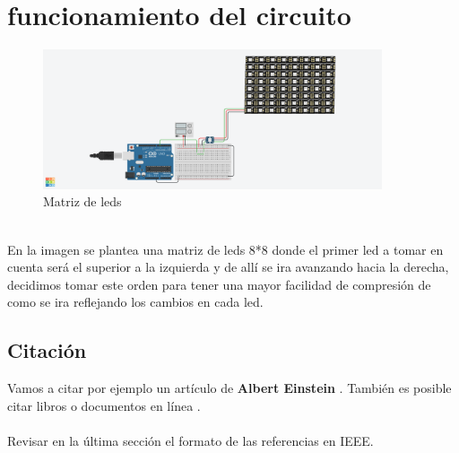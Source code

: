 \documentclass{article}
\begin{document}
\section{funcionamiento del circuito} \label{contenido}

\begin{figure}[h]
\includegraphics[width=10cm]{1.png}
\centering
\caption{Matriz de leds}
\label{fig:matriz de leds}
\end{figure}

\\
En la imagen se plantea una matriz de leds 8*8 donde el primer led a tomar en cuenta será el superior a la izquierda y de allí se ira avanzando hacia la derecha, decidimos tomar este orden para tener una mayor facilidad de compresión de como se ira reflejando los cambios en cada led.






\subsection{Citación}
Vamos a citar por ejemplo un artículo de \textbf{Albert Einstein} \cite{einstein}.
También es posible citar libros \cite{dirac} o documentos en línea \cite{knuthwebsite}.\\\\
Revisar en la última sección el formato de las referencias en IEEE.
\end{document}
